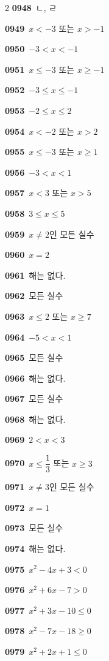 \documentclass[10pt,a4paper]{article}
\begin{document}
\begin{multicols}{2}
\noindent\textbf{0948}\ ㄴ, ㄹ\par
\noindent\textbf{0949}\ $x<-3$ 또는 $x>-1$\par
\noindent\textbf{0950}\ $-3<x<-1$\par
\noindent\textbf{0951}\ $x\le -3$ 또는 $x\ge -1$\par
\noindent\textbf{0952}\ $-3\le x\le -1$\par
\noindent\textbf{0953}\ $-2\le x\le 2$\par
\noindent\textbf{0954}\ $x<-2$ 또는 $x>2$\par
\noindent\textbf{0955}\ $x\le -3$ 또는 $x\ge 1$\par
\noindent\textbf{0956}\ $-3<x<1$\par
\noindent\textbf{0957}\ $x<3$ 또는 $x>5$\par
\noindent\textbf{0958}\ $3\le x\le 5$\par
\noindent\textbf{0959}\ $x\ne 2$인 모든 실수\par
\noindent\textbf{0960}\ $x=2$\par
\noindent\textbf{0961}\ 해는 없다.\par
\noindent\textbf{0962}\ 모든 실수\par
\noindent\textbf{0963}\ $x\le 2$ 또는 $x\ge 7$\par
\noindent\textbf{0964}\ $-5<x<1$\par
\noindent\textbf{0965}\ 모든 실수\par
\noindent\textbf{0966}\ 해는 없다.\par
\noindent\textbf{0967}\ 모든 실수\par
\noindent\textbf{0968}\ 해는 없다.\par
\noindent\textbf{0969}\ $2<x<3$\par
\noindent\textbf{0970}\ $x\le \dfrac{1}{3}$ 또는 $x\ge 3$\par
\noindent\textbf{0971}\ $x\ne 3$인 모든 실수\par
\noindent\textbf{0972}\ $x=1$\par
\noindent\textbf{0973}\ 모든 실수\par
\noindent\textbf{0974}\ 해는 없다.\par
\noindent\textbf{0975}\ $x^2-4x+3<0$\par
\noindent\textbf{0976}\ $x^2+6x-7>0$\par
\noindent\textbf{0977}\ $x^2+3x-10\le 0$\par
\noindent\textbf{0978}\ $x^2-7x-18\ge 0$\par
\noindent\textbf{0979}\ $x^2+2x+1\le 0$\par

\end{multicols}
\end{document}

